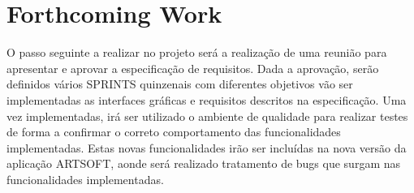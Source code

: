 \documentclass[sigplan]{acmart}
\begin{document}
\section{Forthcoming Work} \label{sec:forthcomingwork}


O passo seguinte a realizar no projeto será a realização de uma reunião para apresentar e aprovar a especificação de requisitos. Dada a aprovação, serão definidos vários SPRINTS quinzenais com diferentes objetivos vão ser implementadas as interfaces gráficas e requisitos descritos na especificação. Uma vez implementadas, irá ser utilizado o ambiente de qualidade para realizar testes de forma a confirmar o correto comportamento das funcionalidades implementadas. Estas novas funcionalidades irão ser incluídas na nova versão da aplicação ARTSOFT, aonde será realizado tratamento de bugs que surgam nas funcionalidades implementadas.



\end{document}
